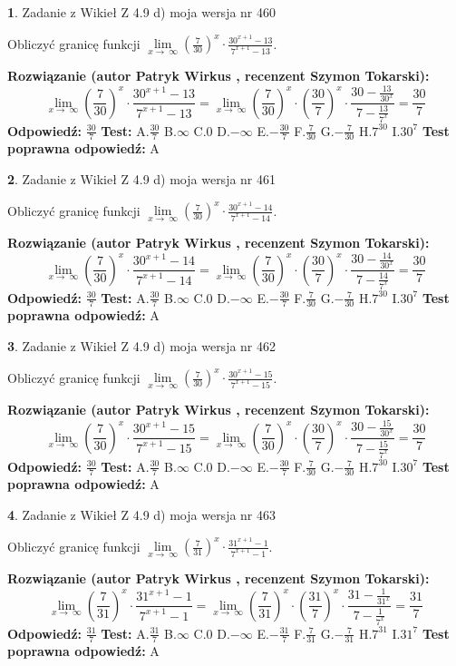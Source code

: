 \documentclass[12pt, a4paper]{article}
\theoremstyle{definition} %
\newtheorem{zad}{}
\newcommand{\zadStart}[1]{\begin{zad}#1\newline}
\newcommand{\zadStop}{\end{zad}}
\newcommand{\rozwStart}[2]{\noindent \textbf{Rozwiązanie (autor #1 , recenzent #2): }\newline}
\newcommand{\rozwStop}{\newline}
\newcommand{\odpStart}{\noindent \textbf{Odpowiedź:}\newline}
\newcommand{\odpStop}{\newline}
\newcommand{\testStart}{\noindent \textbf{Test:}\newline}
\newcommand{\testStop}{\newline}
\newcommand{\kluczStart}{\noindent \textbf{Test poprawna odpowiedź:}\newline}
\newcommand{\kluczStop}{\newline}
\begin{document}
\zadStart{Zadanie z Wikieł Z 4.9 d) moja wersja nr 460}


Obliczyć granicę funkcji  $\lim\limits_{x\to\ \infty}(\frac{7}{30})^{x}\cdot\frac{30^{x+1}-13}{7^{x+1}-13}$.
\zadStop
\rozwStart{Patryk Wirkus}{Szymon Tokarski}
$$\lim\limits_{x\to\ \infty}(\frac{7}{30})^{x}\cdot\frac{30^{x+1}-13}{7^{x+1}-13}=\lim\limits_{x\to\ \infty}(\frac{7}{30})^{x}\cdot(\frac{30}{7})^{x} \cdot \frac{30-\frac{13}{30^{x}}}{7-\frac{13}{7^{x}}} = \frac{30}{7}$$
\rozwStop
\odpStart
$\frac{30}{7}$
\odpStop
\testStart
A.$\frac{30}{7}$ B.$\infty$ C.$0$ D.$-\infty$ E.$-\frac{30}{7}$
F.$\frac{7}{30}$ G.$-\frac{7}{30}$
H.$7^{30}$
I.$30^{7}$
\testStop
\kluczStart
A
\kluczStop



\zadStart{Zadanie z Wikieł Z 4.9 d) moja wersja nr 461}


Obliczyć granicę funkcji  $\lim\limits_{x\to\ \infty}(\frac{7}{30})^{x}\cdot\frac{30^{x+1}-14}{7^{x+1}-14}$.
\zadStop
\rozwStart{Patryk Wirkus}{Szymon Tokarski}
$$\lim\limits_{x\to\ \infty}(\frac{7}{30})^{x}\cdot\frac{30^{x+1}-14}{7^{x+1}-14}=\lim\limits_{x\to\ \infty}(\frac{7}{30})^{x}\cdot(\frac{30}{7})^{x} \cdot \frac{30-\frac{14}{30^{x}}}{7-\frac{14}{7^{x}}} = \frac{30}{7}$$
\rozwStop
\odpStart
$\frac{30}{7}$
\odpStop
\testStart
A.$\frac{30}{7}$ B.$\infty$ C.$0$ D.$-\infty$ E.$-\frac{30}{7}$
F.$\frac{7}{30}$ G.$-\frac{7}{30}$
H.$7^{30}$
I.$30^{7}$
\testStop
\kluczStart
A
\kluczStop



\zadStart{Zadanie z Wikieł Z 4.9 d) moja wersja nr 462}


Obliczyć granicę funkcji  $\lim\limits_{x\to\ \infty}(\frac{7}{30})^{x}\cdot\frac{30^{x+1}-15}{7^{x+1}-15}$.
\zadStop
\rozwStart{Patryk Wirkus}{Szymon Tokarski}
$$\lim\limits_{x\to\ \infty}(\frac{7}{30})^{x}\cdot\frac{30^{x+1}-15}{7^{x+1}-15}=\lim\limits_{x\to\ \infty}(\frac{7}{30})^{x}\cdot(\frac{30}{7})^{x} \cdot \frac{30-\frac{15}{30^{x}}}{7-\frac{15}{7^{x}}} = \frac{30}{7}$$
\rozwStop
\odpStart
$\frac{30}{7}$
\odpStop
\testStart
A.$\frac{30}{7}$ B.$\infty$ C.$0$ D.$-\infty$ E.$-\frac{30}{7}$
F.$\frac{7}{30}$ G.$-\frac{7}{30}$
H.$7^{30}$
I.$30^{7}$
\testStop
\kluczStart
A
\kluczStop



\zadStart{Zadanie z Wikieł Z 4.9 d) moja wersja nr 463}


Obliczyć granicę funkcji  $\lim\limits_{x\to\ \infty}(\frac{7}{31})^{x}\cdot\frac{31^{x+1}-1}{7^{x+1}-1}$.
\zadStop
\rozwStart{Patryk Wirkus}{Szymon Tokarski}
$$\lim\limits_{x\to\ \infty}(\frac{7}{31})^{x}\cdot\frac{31^{x+1}-1}{7^{x+1}-1}=\lim\limits_{x\to\ \infty}(\frac{7}{31})^{x}\cdot(\frac{31}{7})^{x} \cdot \frac{31-\frac{1}{31^{x}}}{7-\frac{1}{7^{x}}} = \frac{31}{7}$$
\rozwStop
\odpStart
$\frac{31}{7}$
\odpStop
\testStart
A.$\frac{31}{7}$ B.$\infty$ C.$0$ D.$-\infty$ E.$-\frac{31}{7}$
F.$\frac{7}{31}$ G.$-\frac{7}{31}$
H.$7^{31}$
I.$31^{7}$
\testStop
\kluczStart
A
\kluczStop
\end{document}
